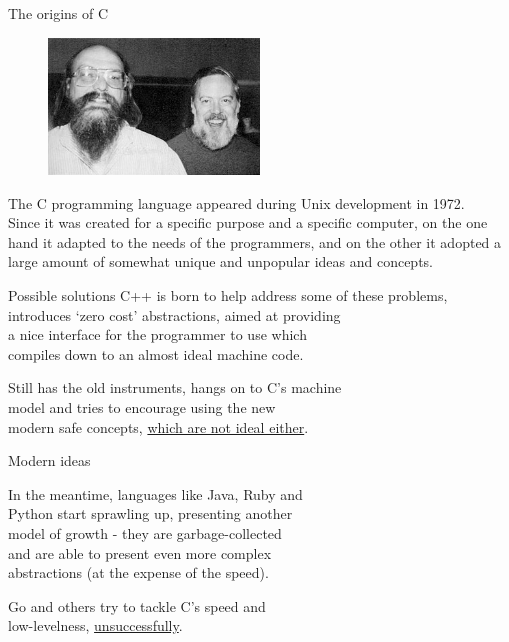 \documentclass[usenames,dvipsnames,10pt,aspectratio=169]{beamer}
\begin{document}
\begin{frame}{The origins of C}

\begin{figure}
\centering
\includegraphics[width=0.5\textwidth]{graphics/ritchie.jpg}
\end{figure}
\normalsize
The C programming language appeared during Unix development in 1972.\\
\vspace{0.3cm}
Since it was created for a specific purpose %
and a specific computer, %
on the one hand it adapted to the
needs of the programmers, and on the 
other it adopted a large
amount of somewhat unique and unpopular 
ideas and concepts.

\vskip 0.8cm

\end{frame}

\begin{frame}{Possible solutions}
\large
C++ is born to help address some of these problems,\\ 
introduces ‘zero cost’ abstractions, aimed at providing\\
a nice interface for the programmer to use which\\
compiles down to an almost ideal machine code.
\vspace{0.5cm}

Still has the old instruments, hangs on to C's machine\\
model %
and tries to encourage using the new\\ 
modern safe concepts, 
\href{https://alexgaynor.net/2019/apr/21/modern-c++-wont-save-us/}
{which are not ideal either}.


\end{frame}

\begin{frame}{Modern ideas}

\large
In the meantime, languages like Java, Ruby and\\
Python start sprawling up, presenting another\\
model of growth - they are garbage-collected\\
and are able to present even more complex\\
abstractions (at the expense of the speed).\\

\vspace{0.5cm}

Go and others try to tackle C's speed and\\
low-levelness, 
\href{https://cowlark.com/2009-11-15-go/}{unsuccessfully}.

\end{frame}
\end{document}
